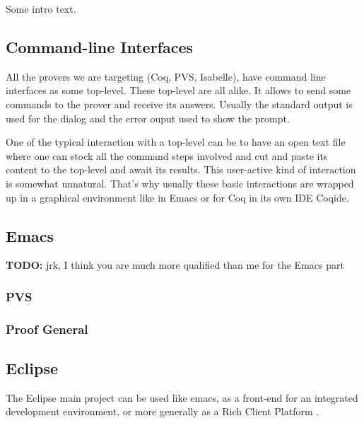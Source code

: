 \documentclass{entcs}
\newcommand{\todo}{\textbf{TODO: }}
\begin{document}
Some intro text. %

\subsection{Command-line Interfaces}
\label{subsec:comm-line-interf}

All the provers we are targeting (Coq, PVS, Isabelle), have command line interfaces as 
some top-level. These top-level are all alike. It allows to send some commands
to the prover and receive its answers. Usually the standard output is
used for the dialog and the error ouput used to show the prompt.

One of the typical interaction with a top-level can be to have an open text file
where one can stock all the command steps involved and cut and paste its 
content to the top-level and await its results. This user-active kind of 
interaction is somewhat unnatural. That's why usually these basic interactions
are wrapped up in a graphical environment like in Emacs or for Coq
in its own IDE Coqide.

\subsection{Emacs}
\label{subsec:emacs}

\todo{jrk, I think you are much more qualified than me for the Emacs
  part} %

\subsubsection{PVS}


\subsubsection{Proof General}

\subsection{Eclipse}
\label{subsec:eclipse}

The Eclipse main project can be used like emacs, as a front-end 
for an integrated development environment, or more generally as
a Rich Client Platform \cite{eclipse-rcp}. 
\end{document}
